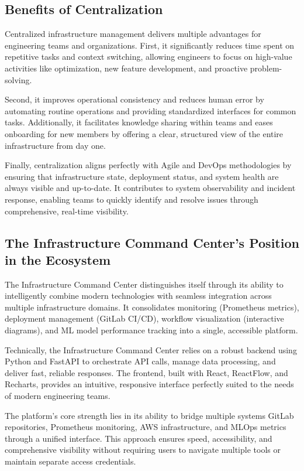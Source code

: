 \subsection{Benefits of Centralization}
Centralized infrastructure management delivers multiple advantages for engineering teams and organizations. First, it significantly reduces time spent on repetitive tasks and context switching, allowing engineers to focus on high-value activities like optimization, new feature development, and proactive problem-solving.

Second, it improves operational consistency and reduces human error by automating routine operations and providing standardized interfaces for common tasks. Additionally, it facilitates knowledge sharing within teams and eases onboarding for new members by offering a clear, structured view of the entire infrastructure from day one.

Finally, centralization aligns perfectly with Agile and DevOps methodologies by ensuring that infrastructure state, deployment status, and system health are always visible and up-to-date. It contributes to system observability and incident response, enabling teams to quickly identify and resolve issues through comprehensive, real-time visibility.

\subsection{The Infrastructure Command Center's Position in the Ecosystem}
The Infrastructure Command Center distinguishes itself through its ability to intelligently combine modern technologies with seamless integration across multiple infrastructure domains. It consolidates monitoring (Prometheus metrics), deployment management (GitLab CI/CD), workflow visualization (interactive diagrams), and ML model performance tracking into a single, accessible platform.

Technically, the Infrastructure Command Center relies on a robust backend using Python and FastAPI to orchestrate API calls, manage data processing, and deliver fast, reliable responses. The frontend, built with React, ReactFlow, and Recharts, provides an intuitive, responsive interface perfectly suited to the needs of modern engineering teams.

The platform's core strength lies in its ability to bridge multiple systems GitLab repositories, Prometheus monitoring, AWS infrastructure, and MLOps metrics through a unified interface. This approach ensures speed, accessibility, and comprehensive visibility without requiring users to navigate multiple tools or maintain separate access credentials.


